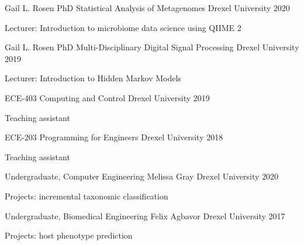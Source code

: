 



\begin{cventries}

\cventry
    {Gail L. Rosen PhD}
    {Statistical Analysis of Metagenomes}
    {Drexel University}
    {2020}
    {\begin{cvitems}
        \item Lecturer: Introduction to microbiome data science using QIIME 2
    \end{cvitems}}
    
\cventry
    {Gail L. Rosen PhD}
    {Multi-Disciplinary Digital Signal Processing}
    {Drexel University}
    {2019}
    {\begin{cvitems}
        \item Lecturer: Introduction to Hidden Markov Models
    \end{cvitems}}

\cventry
    {ECE-403}
    {Computing and Control}
    {Drexel University}
    {2019}
    {\begin{cvitems}
        \item Teaching assistant
    \end{cvitems}}
    
\cventry
    {ECE-203}
    {Programming for Engineers}
    {Drexel University}
    {2018}
    {\begin{cvitems}
        \item Teaching assistant
    \end{cvitems}}
    
\end{cventries}


\begin{cventries}

\cventry
    {Undergraduate, Computer Engineering}
    {Melissa Gray}
    {Drexel University}
    {2020}
    {\begin{cvitems}
        \item Projects: incremental taxonomic classification
    \end{cvitems}}
    
\cventry
    {Undergraduate, Biomedical Engineering}
    {Felix Agbavor}
    {Drexel University}
    {2017}
    {\begin{cvitems}
        \item Projects: host phenotype prediction
    \end{cvitems}}

\end{cventries}

